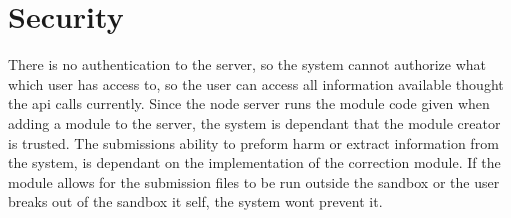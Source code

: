 \section{Security}
There is no authentication to the server, so the system cannot authorize what which user has access to, so the user can access all information available thought the api calls currently. Since the node server runs the module code given when adding a module to the server, the system is dependant that the module creator is trusted. The submissions ability to preform harm or extract information from the system, is dependant on the implementation of the correction module. If the module allows for the submission files to be run outside the sandbox or the user breaks out of the sandbox it self, the system wont prevent it.